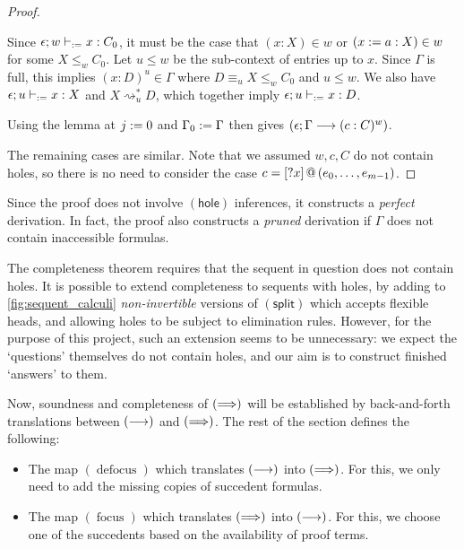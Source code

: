 \documentclass[twoside]{report}
\begin{document}
\begin{proof}
\begin{itemize}
              Since $\epsilon; w \vdash_{:=} x : C_0$, it must be the case that $(x : X) \in w$ or $(x := a : X) \in w$ for some $X \leq_w C_0$. Let $u \leq w$ be the sub-context of entries up to $x$. Since $\Gamma$ is full, this implies $(x : D)^u \in \Gamma$ where $D \equiv_u X \leq_w C_0$ and $u \leq w$. We also have $\epsilon; u \vdash_{:=} x : X$ and $X \rightsquigarrow_u^\ast D$, which together imply $\epsilon; u \vdash_{:=} x : D$.

              Using the lemma at $j := 0$ and $\Gamma_0 := \Gamma$ then gives $(\epsilon; \Gamma \longrightarrow (c : C)^w)$.
    \end{itemize}

    The remaining cases are similar. Note that we assumed $w,c,C$ do not contain holes, so there is no need to consider the case $c = {[?x]}\,@\,({e_0, \ldots, e_{m-1}})$.
\end{proof}

Since the proof does not involve $(\mathsf{hole})$ inferences, it constructs a \emph{perfect} derivation. In fact, the proof also constructs a \emph{pruned} derivation if $\Gamma$ does not contain inaccessible formulas.

The completeness theorem requires that the sequent in question does not contain holes. It is possible to extend completeness to sequents with holes, by adding to \cref{fig:sequent_calculi} \emph{non-invertible} versions of $(\mathsf{split})$ which accepts flexible heads, and allowing holes to be subject to elimination rules. However, for the purpose of this project, such an extension seems to be unnecessary: we expect the `questions' themselves do not contain holes, and our aim is to construct finished `answers' to them.

\newcommand{\focus}{\operatorname{focus}}
\newcommand{\defocus}{\operatorname{defocus}}
\def\proofSkipAmount{\vskip 0.1em}

Now, soundness and completeness of $(\Longrightarrow)$ will be established by back-and-forth translations between $(\longrightarrow)$ and $(\Longrightarrow)$. The rest of the section defines the following:

\begin{itemize}
    \item The map $(\defocus)$ which translates $(\longrightarrow)$ into $(\Longrightarrow)$. For this, we only need to add the missing copies of succedent formulas.

    \item The map $(\focus)$ which translates $(\Longrightarrow)$ into $(\longrightarrow)$. For this, we choose one of the succedents based on the availability of proof terms.
\end{itemize}
\end{document}

